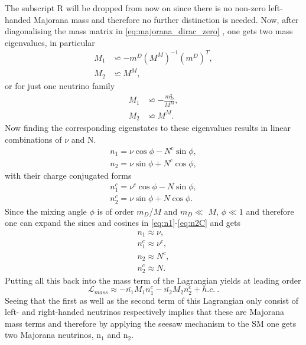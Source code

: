The subscript R will be dropped from now on since there is no non-zero left-handed Majorana mass and therefore no further distinction is needed.\newline\indent
Now, after diagonalising the mass matrix in \eqref{eq:majorana_dirac_zero} \cite[pp. 2-3]{Lindner:2001hr}, one gets two mass eigenvalues, in particular
\begin{align*}
	M_1&\backsimeq-m^D{\left(M^M\right)}^{-1}{\left(m^D\right)}^{T},\\
	M_2&\backsimeq M^M,
\end{align*}
or for just one neutrino family
\begin{align}
	M_1&\backsimeq -\frac{m_D^2}{M^M},
	\label{eq:light_neutrino}
	\\
	M_2&\backsimeq M^M.
	\label{eq:heavy_neutrino}
\end{align}
Now finding the corresponding eigenstates to these eigenvalues results in linear combinations of $\nu$ and N.
\begin{align}
	n_{1}=\nu\cos\phi-N^c\sin\phi,
	\label{eq:n1}
	\\
	n_{2}=\nu\sin\phi+N^c\cos\phi,
	\label{eq:n2}
\end{align}
with their charge conjugated forms
\begin{align}
n_{1}^c=\nu^c\cos\phi-N\sin\phi,
\label{eq:n1C}
\\
n_{2}^c=\nu\sin\phi+N\cos\phi.
\label{eq:n2C}
\end{align}
Since the mixing angle $\phi$ is of order $m_D$/$M$ and $m_D\ll$ $M$, $\phi\ll1$ and therefore one can expand the sines and cosines in \eqref{eq:n1}-\eqref{eq:n2C} and gets
\begin{align}
	n_{1}\approx\nu,\\
	n_{1}^c\approx\nu^c,\\
	n_{2}\approx N^c,\\
	n_{2}^c\approx N.
\end{align}
Putting all this back into the mass term of the Lagrangian yields at leading order
\begin{equation}
	\mathcal{L}_{mass}\approx-\overline{n_1}M_1n_1^c-\overline{n_2}M_2n_2^c+h.c.\:.
\end{equation}
Seeing that the first as well as the second term of this Lagrangian only consist of left- and right-handed neutrinos respectively implies that these are Majorana mass terms and therefore by applying the seesaw mechanism to the SM one gets two Majorana neutrinos, n$_1$ and n$_2$. \newline\indent
